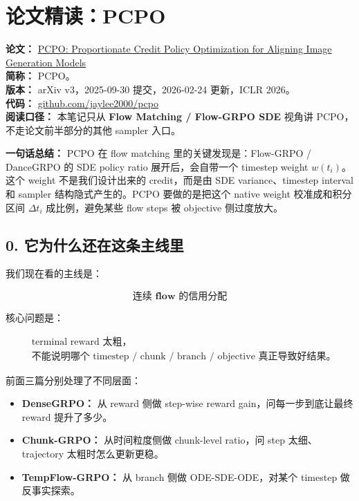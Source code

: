 
\section{论文精读：PCPO}

\textbf{论文：} \href{https://arxiv.org/abs/2509.25774}{PCPO: Proportionate Credit Policy Optimization for Aligning Image Generation Models}\\
\textbf{简称：} PCPO。\\
\textbf{版本：} arXiv v3，2025-09-30 提交，2026-02-24 更新，ICLR 2026。\\
\textbf{代码：} \href{https://github.com/jaylee2000/pcpo/}{github.com/jaylee2000/pcpo}\\
\textbf{阅读口径：} 本笔记只从 \textbf{Flow Matching / Flow-GRPO SDE} 视角讲 PCPO，不走论文前半部分的其他 sampler 入口。

\begin{conceptbox}
\textbf{一句话总结：} PCPO 在 flow matching 里的关键发现是：Flow-GRPO / DanceGRPO 的 SDE policy ratio 展开后，会自带一个 timestep weight \(w(t_i)\)。这个 weight 不是我们设计出来的 credit，而是由 SDE variance、timestep interval 和 sampler 结构隐式产生的。PCPO 要做的是把这个 native weight 校准成和积分区间 \(\Delta t_i\) 成比例，避免某些 flow steps 被 objective 侧过度放大。
\end{conceptbox}

\subsection{0. 它为什么还在这条主线里}

我们现在看的主线是：

\[
\textbf{连续 flow 的信用分配}
\]

核心问题是：

\begin{align*}
&\text{terminal reward 太粗，}\\
&\text{不能说明哪个 timestep / chunk / branch / objective 真正导致好结果。}
\end{align*}

前面三篇分别处理了不同层面：

\begin{itemize}[leftmargin=2em]
  \item \textbf{DenseGRPO：} 从 reward 侧做 step-wise reward gain，问每一步到底让最终 reward 提升了多少。
  \item \textbf{Chunk-GRPO：} 从时间粒度侧做 chunk-level ratio，问 step 太细、trajectory 太粗时怎么更新更稳。
  \item \textbf{TempFlow-GRPO：} 从 branch 侧做 ODE-SDE-ODE，对某个 timestep 做反事实探索。
\end{itemize}

